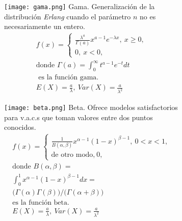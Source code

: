 \begin{figure}[H]
\begin{subfigure}[t]{.475\textwidth}\texttt{[image: gama.png]}
Gama. Generalización de la distribución \emph{Erlang} cuando el parámetro $n$ no es necesariamente un entero.
\begin{equation}\begin{matrix}
f(x)=\begin{cases}\frac{\lambda^a}{\Gamma(a)}x^{a-1}e^{-\lambda x},\ x\geq 0,\\0,\ x<0,\end{cases}\\
\text{donde }\Gamma(a)=\int_{0}^{\infty}t^{a-1}e^{-t}dt\\\text{ es la función gama.}\\
E(X)=\frac{a}{\lambda},\ Var(X)=\frac{a}{\lambda^2}
\end{matrix}\end{equation}\end{subfigure}\qquad
\begin{subfigure}[t]{.475\textwidth}\texttt{[image: beta.png]}
Beta. Ofrece modelos satisfactorios para v.a.c.s que toman valores entre dos puntos conocidos.
\begin{equation}\begin{matrix}
f(x)=\begin{cases}\frac{1}{B(\alpha,\beta)}x^{\alpha-1}(1-x)^{\beta-1},\ 0<x<1,\\\text{de otro modo,}\ 0,\end{cases}\\
\text{donde } B(\alpha,\beta)=\\
\int_{0}^{1}x^{\alpha-1}(1-x)^{\beta-1}dx=\\
(\Gamma(\alpha)\Gamma(\beta)\big)/\big(\Gamma(\alpha+\beta)\big)\\
\text{es la función beta.}\\
E(X)=\frac{a}{\lambda},\ Var(X)=\frac{a}{\lambda^2}
\end{matrix}\end{equation}\end{subfigure}
\end{figure}